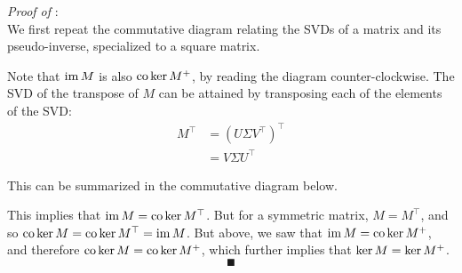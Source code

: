 \documentclass[../../thesis.tex]{subfiles}
\begin{document}
\noindent \textit{Proof of }:\\
We first repeat the commutative diagram
relating the SVDs of a matrix and its pseudo-inverse,
specialized to a square matrix.

\begin{center}
\end{center}

Note that $\operatorname*{im} M$ is also $\operatorname*{co}\ker M^{+}$,
by reading the diagram counter-clockwise.
The SVD of the transpose of $M$
can be attained by transposing each of the elements of the SVD\@:
\begin{align}
	M^\top
	&= {\left(U \Sigma V^\top\right)}^\top\\
	&= V \Sigma U^\top
\end{align}

This can be summarized in the commutative diagram below.

\begin{center}
\end{center}

This implies that $\operatorname*{im} M = \operatorname*{co}\ker M^\top$.
But for a symmetric matrix,
$M = M^\top$,
and so $\operatorname*{co}\ker M = \operatorname*{co}\ker M^\top = \operatorname*{im} M$.
But above, we saw that $\operatorname*{im} M = \operatorname*{co}\ker M^{+}$,
and therefore $\operatorname*{co}\ker M = \operatorname*{co}\ker M^{+}$,
which further implies that $\ker M = \ker M^{+}$.
\[\QED\]
\end{document}
